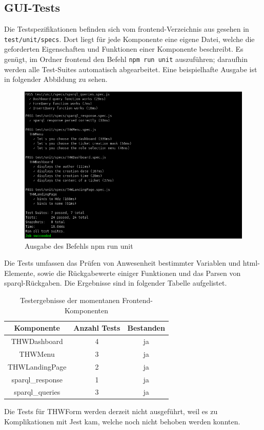 \documentclass[a4paper,11pt,oneside, titlepage]{article}
\begin{document}
\subsection{GUI-Tests}
Die Testspezifikationen befinden sich vom frontend-Verzeichnis aus gesehen in \verb+test/unit/specs+.
Dort liegt für jede Komponente eine eigene Datei, welche die geforderten Eigenschaften und Funktionen
einer Komponente beschreibt. Es genügt, im Ordner frontend den Befehl \verb+npm run unit+ auszuführen; daraufhin werden alle Test-Suites automatisch abgearbeitet. Eine beispielhafte Ausgabe ist in folgender Abbildung zu sehen.
\newline
\begin{figure}[htpb]
\centering
\includegraphics[width=0.8\linewidth]{test}
\caption{Ausgabe des Befehls npm run unit}
\label{fig:npmtest}
\end{figure}
\newline
Die Tests umfassen das Prüfen von Anwesenheit bestimmter Variablen und html-Elemente, sowie die Rückgabewerte einiger Funktionen und das Parsen von sparql-Rückgaben.
Die Ergebnisse sind in folgender Tabelle aufgelistet.
\newpage
\begin{table}[htpb]
\centering
\label{tab:test}
\begin{tabular}{c | c | c}
Komponente & Anzahl Tests & Bestanden \\
\hline
THWDashboard & 4 & ja \\
THWMenu & 3 & ja \\
THWLandingPage & 2 & ja\\
sparql\_response & 1 & ja\\
sparql\_queries & 3 & ja\\
\end{tabular}

\caption{Testergebnisse der momentanen Frontend-Komponenten}
\end{table}
Die Tests für THWForm werden derzeit nicht ausgeführt, weil es zu Komplikationen mit Jest kam, welche noch nicht behoben werden konnten.
\end{document}
